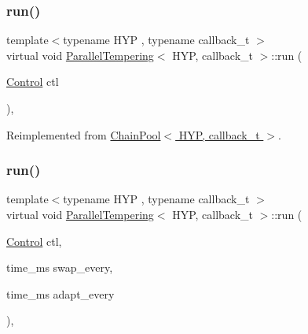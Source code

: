 \mbox{\label{class_parallel_tempering_ab244166aa3c7abf2a67b9cd8ca45f844}} 
\subsubsection{\texorpdfstring{run()}{run()}\hspace{0.1cm}{\footnotesize\ttfamily [1/2]}}
{\footnotesize\ttfamily template$<$typename H\+YP , typename callback\+\_\+t $>$ \\
virtual void \hyperlink{class_parallel_tempering}{Parallel\+Tempering}$<$ H\+YP, callback\+\_\+t $>$\+::run (\begin{DoxyParamCaption}\item[{\hyperlink{struct_control}{Control}}]{ctl }\end{DoxyParamCaption})\hspace{0.3cm}{\ttfamily [inline]}, {\ttfamily [virtual]}}



Reimplemented from \hyperlink{class_chain_pool_af5f0e391f9794ff89f29296c8b41bf8e}{Chain\+Pool$<$ H\+Y\+P, callback\+\_\+t $>$}.

\mbox{\label{class_parallel_tempering_a40df4781b1d06acff7b0902c4d4a5a87}} 
\subsubsection{\texorpdfstring{run()}{run()}\hspace{0.1cm}{\footnotesize\ttfamily [2/2]}}
{\footnotesize\ttfamily template$<$typename H\+YP , typename callback\+\_\+t $>$ \\
virtual void \hyperlink{class_parallel_tempering}{Parallel\+Tempering}$<$ H\+YP, callback\+\_\+t $>$\+::run (\begin{DoxyParamCaption}\item[{\hyperlink{struct_control}{Control}}]{ctl,  }\item[{time\+\_\+ms}]{swap\+\_\+every,  }\item[{time\+\_\+ms}]{adapt\+\_\+every }\end{DoxyParamCaption})\hspace{0.3cm}{\ttfamily [inline]}, {\ttfamily [virtual]}}

